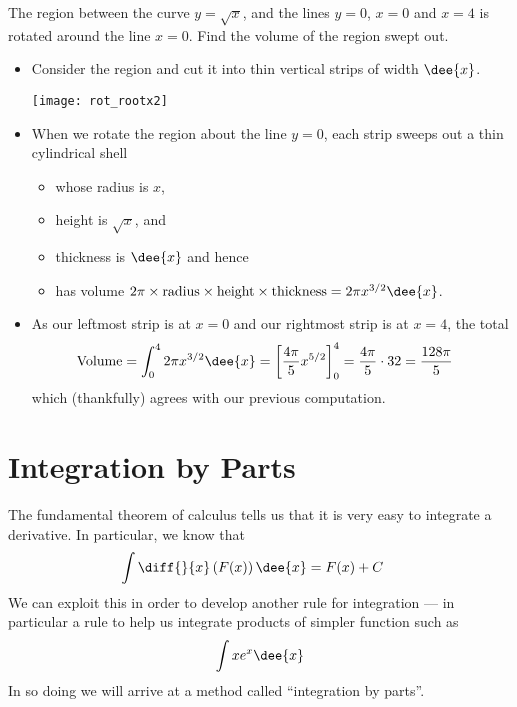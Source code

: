 \begin{eg}
The region between the curve $y=\sqrt{x}$, and the lines $y=0$, $x=0$ and $x=4$
is rotated around the line $x=0$. Find the volume of the region swept out.

\soln
\begin{itemize}
 \item Consider the region and cut it into thin vertical strips of width $\dee{x}$.
\begin{efig}
 \centering
\texttt{[image: rot\_rootx2]}
\end{efig}

\item When we rotate the region about the line $y=0$, each strip sweeps out a thin
cylindrical shell
\begin{itemize}
\item whose radius is $x$,
\item height is $\sqrt{x}$, and
\item thickness is $\dee{x}$ and hence
\item has volume $2 \pi \times \text{radius} \times \text{height} \times \text{thickness}
= 2 \pi x^{3/2} \dee{x}$.
\end{itemize}
\item As our leftmost strip is at $x=0$ and our rightmost strip is
at $x=4$, the total
\begin{align*}
\text{Volume}
&= \int _0^4 2\pi x^{3/2} \dee{x}
=\left[\frac{4\pi}{5} x^{5/2} \right]_0^4
= \frac{4\pi}{5}\cdot 32 = \frac{128\pi}{5}
\end{align*}
which (thankfully) agrees with our previous computation.

\end{itemize}
\end{eg}

\section{Integration by Parts}\label{sec intbyparts}
The fundamental theorem of calculus tells us that it is very easy to integrate a
derivative. In particular, we know that
\begin{align*}
  \int \diff{}{x}\left( F(x) \right) \dee{x} &= F(x)+C
\end{align*}
We can exploit this in order to develop another rule for integration --- in particular a
rule to help us integrate products of simpler function such as
\begin{align*}
  \int x e^x \dee{x}
\end{align*}
In so doing we will arrive at a method called ``integration by parts''.


